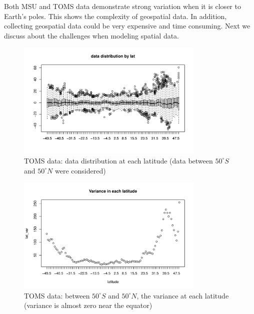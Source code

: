 Both MSU and TOMS data demonstrate strong variation when it is closer to Earth's poles. This shows the complexity of geospatial data. In addition, collecting geospatial data could be very expensive and time consuming. Next we discuss about the challenges when modeling spatial data.
\\

 \begin{figure}[H]
 \centering
 \includegraphics [width=0.8\textwidth, keepaspectratio]{graphs/TOMS_data_latitude.pdf}
 \caption{TOMS data: data distribution at each latitude (data between $50^\circ S$ and $50^\circ N$ were considered)}
 \label{TOMS_data_latitude}
 \end{figure}

 \begin{figure}[H]
 \centering
 \includegraphics [width=0.8\textwidth, keepaspectratio]{graphs/TOMS_data_var_lat.pdf}
 \caption{TOMS data: between $50^\circ S$ and $50^\circ N$, the variance at each latitude (variance is almost zero near the equator)}
 \label{TOMS_data_var_lat}
 \end{figure}


